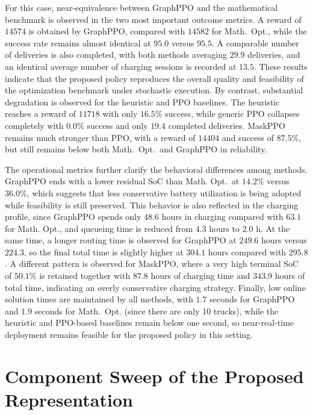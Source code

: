 \documentclass[journal]{IEEEtran}
\begin{document}
For this case, near-equivalence between GraphPPO and the mathematical benchmark is observed in the two most important outcome metrics. A reward of $14574$ is obtained by GraphPPO, compared with $14582$ for Math.\ Opt., while the success rate remains almost identical at $95.0$ versus $95.5$. A comparable number of deliveries is also completed, with both methods averaging $29.9$ deliveries, and an identical average number of charging sessions is recorded at $13.5$. These results indicate that the proposed policy reproduces the overall quality and feasibility of the optimization benchmark under stochastic execution. By contrast, substantial degradation is observed for the heuristic and PPO baselines. The heuristic reaches a reward of $11718$ with only $16.5\%$ success, while generic PPO collapses completely with $0.0\%$ success and only $19.4$ completed deliveries. MaskPPO remains much stronger than PPO, with a reward of $14404$ and success of $87.5\%$, but still remains below both Math.\ Opt.\ and GraphPPO in reliability.

The operational metrics further clarify the behavioral differences among methods. GraphPPO ends with a lower residual SoC than Math. Opt.\ at $14.2\%$ versus $36.0\%$, which suggests that less conservative battery utilization is being adopted while feasibility is still preserved. This behavior is also reflected in the charging profile, since GraphPPO spends only $48.6$ hours in charging compared with $63.1$ for Math. Opt., and queueing time is reduced from $4.3$ hours to $2.0$ h. At the same time, a longer routing time is observed for GraphPPO at $249.6$ hours versus $224.3$, so the final total time is slightly higher at $304.1$ hours compared with $295.8$. A different pattern is observed for MaskPPO, where a very high terminal SoC of $50.1\%$ is retained together with $87.8$ hours of charging time and $343.9$ hours of total time, indicating an overly conservative charging strategy. Finally, low online solution times are maintained by all methods, with $1.7$ seconds for GraphPPO and $1.9$ seconds for Math.\ Opt. (since there are only 10 trucks), while the heuristic and PPO-based baselines remain below one second, so near-real-time deployment remains feasible for the proposed policy in this setting.


\section{Component Sweep of the Proposed Representation}
\end{document}
